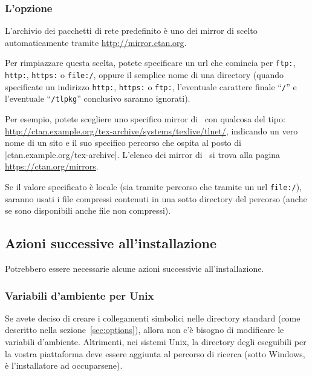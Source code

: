 \documentclass{article}
\begin{document}
\subsubsection{L'opzione }
\label{sec:location}

L'archivio dei pacchetti di rete predefinito è uno dei mirror di \CTAN{}
scelto automaticamente tramite \url{http://mirror.ctan.org}.

Per rimpiazzare questa scelta, potete specificare un url che comincia per
\texttt{ftp:}, \texttt{http:}, \texttt{https:} o \texttt{file:/}, oppure
il semplice nome di una directory (quando specificate un indirizzo
\texttt{http:}, \texttt{https:} o \texttt{ftp:}, l'eventuale carattere
finale ``\texttt{/}'' e l'eventuale ``\texttt{/tlpkg}'' conclusivo saranno
ignorati).

Per esempio, potete scegliere uno specifico mirror di \CTAN\ con qualcosa
del tipo:
\url{http://ctan.example.org/tex-archive/systems/texlive/tlnet/},
indicando un vero nome di un sito e il suo specifico
percorso che ospita \CTAN al posto di |ctan.example.org/tex-archive|. 
L'elenco dei mirror di \CTAN\ si trova alla
pagina \url{https://ctan.org/mirrors}.
 
Se il valore specificato è locale (sia tramite percorso che tramite un url
\texttt{file:/}), saranno usati i file compressi contenuti in una sotto
directory  del percorso (anche se sono disponibili anche
file non compressi).


\subsection{Azioni successive all'installazione}
\label{sec:postinstall}

Potrebbero essere necessarie alcune azioni successivie all'installazione.

\subsubsection{Variabili d'ambiente per Unix}
\label{sec:env}

Se avete deciso di creare i collegamenti simbolici nelle directory standard
(come descritto nella sezione~\ref{sec:options}), allora non c'è bisogno di
modificare le variabili d'ambiente. Altrimenti, nei sistemi Unix, la
directory degli eseguibili per la vostra piattaforma deve essere aggiunta al
percorso di ricerca (sotto Windows, è l'installatore ad occuparsene).
\end{document}
